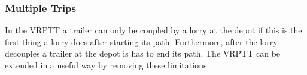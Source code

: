 









\subsubsection{Multiple Trips}
In the VRPTT a trailer can only be coupled by a lorry at the depot if this is the first thing a lorry does after starting its path.
Furthermore, after the lorry decouples a trailer at the depot is has to end its path.
The VRPTT can be extended in a useful way by removing these limitations. \\


